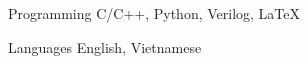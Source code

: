 

\begin{cvskills}




  \cvskill
    {Programming} %
    {C/C++, Python, Verilog, LaTeX} %

  \cvskill
    {Languages} %
    {English, Vietnamese} %

\end{cvskills}
